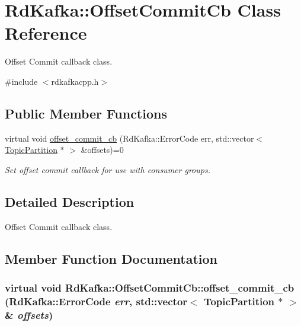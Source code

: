 \hypertarget{classRdKafka_1_1OffsetCommitCb}{
\section{RdKafka::OffsetCommitCb Class Reference}
\label{classRdKafka_1_1OffsetCommitCb}
}


Offset Commit callback class.  


{\ttfamily \#include $<$rdkafkacpp.h$>$}\subsection*{Public Member Functions}
\begin{DoxyCompactItemize}
\item 
virtual void \hyperlink{classRdKafka_1_1OffsetCommitCb_adba61797f3db9fd4acf97c3b31deb413}{offset\_\-commit\_\-cb} (RdKafka::ErrorCode err, std::vector$<$ \hyperlink{classRdKafka_1_1TopicPartition}{TopicPartition} $\ast$ $>$ \&offsets)=0
\begin{DoxyCompactList}\small\item\em Set offset commit callback for use with consumer groups. \item\end{DoxyCompactList}\end{DoxyCompactItemize}


\subsection{Detailed Description}
Offset Commit callback class. 

\subsection{Member Function Documentation}
\hypertarget{classRdKafka_1_1OffsetCommitCb_adba61797f3db9fd4acf97c3b31deb413}{
\subsubsection[{offset\_\-commit\_\-cb}]{\setlength{\rightskip}{0pt plus 5cm}virtual void RdKafka::OffsetCommitCb::offset\_\-commit\_\-cb (RdKafka::ErrorCode {\em err}, \/  std::vector$<$ {\bf TopicPartition} $\ast$ $>$ \& {\em offsets})}}
\label{classRdKafka_1_1OffsetCommitCb_adba61797f3db9fd4acf97c3b31deb413}


